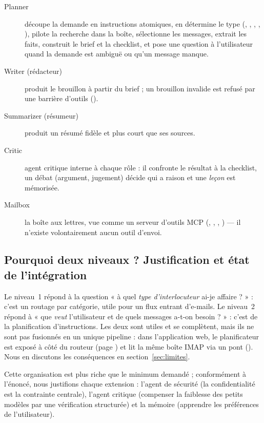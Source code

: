 \begin{description}
  \item[Planner] découpe la demande en instructions atomiques, en détermine le type (, , , , ), pilote la recherche dans la boîte, sélectionne les messages, extrait les faits, construit le brief et la checklist, et pose une question à l'utilisateur quand la demande est ambiguë ou qu'un message manque.
  \item[Writer (rédacteur)] produit le brouillon à partir du brief ; un brouillon invalide est refusé par une barrière d'outils ().
  \item[Summarizer (résumeur)] produit un résumé fidèle et plus court que ses sources.
  \item[Critic] agent critique interne à chaque rôle : il confronte le résultat à la checklist, un débat (argument, jugement) décide qui a raison et une \emph{leçon} est mémorisée.
  \item[Mailbox] la boîte aux lettres, vue comme un serveur d'outils MCP (, , , ) --- il n'existe volontairement aucun outil d'envoi.
\end{description}

\subsection{Pourquoi deux niveaux ? Justification et état de l'intégration}

Le niveau~1 répond à la question « à quel \emph{type d'interlocuteur} ai-je affaire ? » : c'est un routage par catégorie, utile pour un flux entrant d'e-mails. Le niveau~2 répond à « que \emph{veut} l'utilisateur et de quels messages a-t-on besoin ? » : c'est de la planification d'instructions. Les deux sont utiles et se complètent, mais ils ne sont pas fusionnés en un unique pipeline : dans l'application web, le planificateur est exposé à côté du routeur (page ) et lit la même boîte IMAP via un pont (). Nous en discutons les conséquences en section~\ref{sec:limites}.

Cette organisation est plus riche que le minimum demandé ; conformément à l'énoncé, nous justifions chaque extension : l'agent de sécurité (la confidentialité est la contrainte centrale), l'agent critique (compenser la faiblesse des petits modèles par une vérification structurée) et la mémoire (apprendre les préférences de l'utilisateur).
